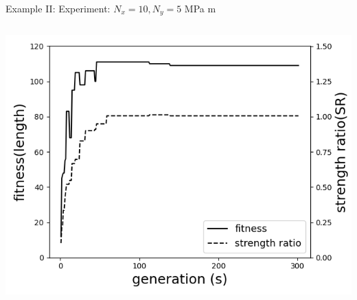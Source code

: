 \documentclass{beamer}
\begin{document}
\begin{frame}{Example II: Experiment: $N_x = 10, N_y=5 $ MPa m}
    \begin{columns}
    \begin{column}{0.5\textwidth}

        \begin{center}
			\includegraphics[width=1.0\linewidth]{./fig/two_distinct_angle_fitness_and_sr.png}
        \end{center}


\end{column}
\end{columns}
\end{frame}
\end{document}
